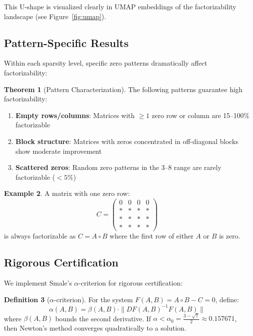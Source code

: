 \documentclass{article}
\theoremstyle{definition}
\newtheorem{theorem}{Theorem}
\newtheorem{definition}[theorem]{Definition}
\newtheorem{example}[theorem]{Example}
\begin{document}
This U-shape is visualized clearly in UMAP embeddings of the factorizability landscape (see Figure~\ref{fig:umap}).

\subsection{Pattern-Specific Results}

Within each sparsity level, specific zero patterns dramatically affect factorizability:

\begin{theorem}[Pattern Characterization]
The following patterns guarantee high factorizability:
\begin{enumerate}
\item \textbf{Empty rows/columns}: Matrices with $\geq 1$ zero row or column are 15--100\% factorizable
\item \textbf{Block structure}: Matrices with zeros concentrated in off-diagonal blocks show moderate improvement
\item \textbf{Scattered zeros}: Random zero patterns in the 3--8 range are rarely factorizable ($<5\%$)
\end{enumerate}
\end{theorem}

\begin{example}
A matrix with one zero row:
\[
C = \begin{pmatrix}
0 & 0 & 0 & 0 \\
* & * & * & * \\
* & * & * & * \\
* & * & * & *
\end{pmatrix}
\]
is always factorizable as $C = A \circ B$ where the first row of either $A$ or $B$ is zero.
\end{example}

\subsection{Rigorous Certification}

We implement Smale's $\alpha$-criterion for rigorous certification:

\begin{definition}[$\alpha$-criterion]
For the system $F(A,B) = A \circ B - C = 0$, define:
\[
\alpha(A,B) = \beta(A,B) \cdot \|DF(A,B)^{-1} F(A,B)\|
\]
where $\beta(A,B)$ bounds the second derivative. If $\alpha < \alpha_0 = \frac{3 - \sqrt{7}}{2} \approx 0.157671$, then Newton's method converges quadratically to a solution.
\end{definition}
\end{document}
